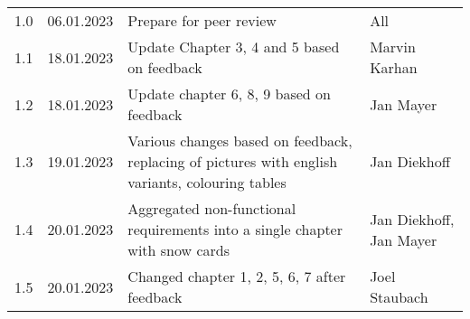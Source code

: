\begin{footnotesize}
\begin{longtable}[L L L L]{ p{} p{} p{} p{} }
    \rowcolor{Gray}
    1.0              & 06.01.2023    & Prepare for peer review                                                                                                                       & All             \\
    
    1.1              & 18.01.2023    & Update Chapter 3, 4 and 5 based on feedback                                                                                                   & Marvin Karhan   \\

    \rowcolor{Gray}
    1.2              & 18.01.2023    & Update chapter 6, 8, 9 based on feedback                                                                             & Jan Mayer    \\

    1.3              & 19.01.2023    & Various changes based on feedback, replacing of pictures with english variants, colouring tables                                              & Jan Diekhoff    \\
    \rowcolor{Gray}
    1.4              & 20.01.2023    & Aggregated non-functional requirements into a single chapter with snow cards                                                                  & Jan Diekhoff, Jan Mayer    \\
    1.5              & 20.01.2023    &  Changed chapter 1, 2, 5, 6, 7 after feedback                                                                 & Joel Staubach   \\
    \bottomrule
  \end{longtable}
\end{footnotesize}
\rmfamily